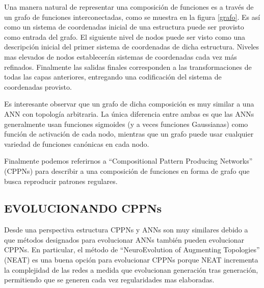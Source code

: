 Una manera natural de representar una composición de funciones es a través de un grafo de funciones interconectadas, como se muestra en la figura \ref{grafo}. Es así como un sistema de coordenadas inicial de una estructura puede ser provisto como entrada del grafo. El siguiente nivel de nodos puede ser visto como una descripción inicial del primer sistema de coordenadas de dicha estructura. Niveles mas elevados de nodos establecerán sistemas de coordenadas cada vez más refinados. Finalmente las salidas finales corresponden a las transformaciones de todas las capas anteriores, entregando una codificación del sistema de coordenadas provisto.

Es interesante observar que un grafo de dicha composición es muy similar a una ANN con topología arbitraria. La única diferencia entre ambas es que las ANNs generalmente usan funciones sigmoides (y a veces funciones Gaussianas) como función de activación de cada nodo, mientras que un grafo puede usar cualquier variedad de funciones canónicas en cada nodo.

Finalmente podemos referirnos a ``Compositional Pattern Producing Networks'' (CPPNs) para describir a una composición de funciones en forma de grafo que busca reproducir patrones regulares.

\subsection{EVOLUCIONANDO CPPNs}



Desde una perspectiva estructura CPPNs y ANNs son muy similares debido a que métodos designados para evolucionar ANNs también pueden evolucionar CPPNs. En particular, el método de ``NeuroEvolution of Augmenting Topologies'' (NEAT) es una buena opción para evolucionar CPPNs porque NEAT incrementa la complejidad de las redes a medida que evolucionan generación tras generación, permitiendo que se generen cada vez regularidades mas elaboradas.